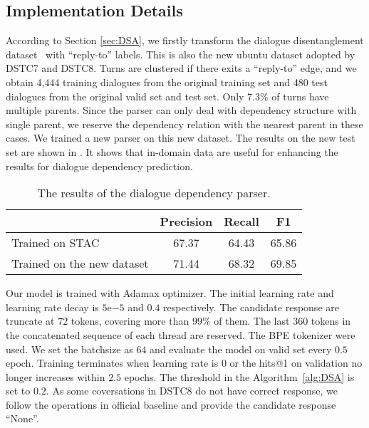 \subsection{Implementation Details }
According to Section \ref{sec:DSA}, we firstly transform the dialogue disentanglement dataset~\cite{KummerfeldGPAGG19} with ``reply-to'' labels. This is also the new ubuntu dataset adopted by DSTC7 and DSTC8. Turns are clustered if there exits a ``reply-to'' edge, 
and we obtain 4,444 training dialogues from the original training set and 480 test dialogues 
from the original valid set and test set. Only 7.3\% of turns have multiple parents. 
Since the parser can only deal with dependency structure with single parent, 
we reserve the dependency relation with the nearest parent in these cases. 
We trained a new parser on this new dataset. The results on the new test set are shown 
in . It shows that in-domain data are useful for enhancing the 
results for dialogue dependency prediction.

\begin{table}[th]
	\centering
	\scriptsize
	\begin{tabular}{lccc}
		\toprule[1pt]
		\textbf{} & {Precision}& {Recall}& {F1} \\ 
		\midrule[1pt]
		{Trained on STAC} & 67.37 &64.43&65.86\\
		{Trained on the new dataset} & 71.44 & 68.32&69.85\\
		\bottomrule[1pt]
	\end{tabular}
	\caption{The results of the dialogue dependency parser.}
	\label{tab:parser}
\end{table}


Our model is trained with Adamax optimizer. The initial learning rate and learning rate decay is $5\mathrm{e}{-5}$ and $0.4$ respectively. The candidate response are truncate at $72$ tokens, covering more than $99\%$ of them. The last $360$ tokens in the concatenated sequence of each thread are reserved. The BPE tokenizer were used. 
We set the batchsize as $64$ and evaluate the model on valid set every $0.5$ epoch. 
Training terminates when learning rate is $0$ or the hits@1 on validation no longer increases within $2.5$ epochs. 
The threshold in the Algorithm~\ref{alg:DSA} is set to $0.2$.
As some coversations in DSTC8 do not have correct response, we follow the operations in official baseline and provide the candidate response ``None''. 

